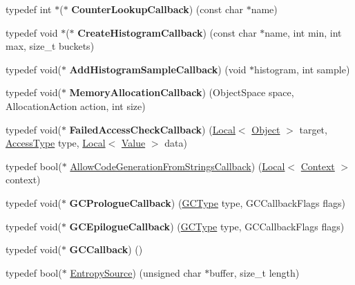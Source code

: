 \begin{DoxyCompactItemize}
\item 
\hypertarget{namespacev8_a5efca05a9f1f278a4eec832ce419104f}{}typedef int $\ast$($\ast$ {\bfseries Counter\+Lookup\+Callback}) (const char $\ast$name)\label{namespacev8_a5efca05a9f1f278a4eec832ce419104f}

\item 
\hypertarget{namespacev8_aafbf15734701792a14c02dbca7535b75}{}typedef void $\ast$($\ast$ {\bfseries Create\+Histogram\+Callback}) (const char $\ast$name, int min, int max, size\+\_\+t buckets)\label{namespacev8_aafbf15734701792a14c02dbca7535b75}

\item 
\hypertarget{namespacev8_a5a7c6bb8050ad84f0a453056ec325d1c}{}typedef void($\ast$ {\bfseries Add\+Histogram\+Sample\+Callback}) (void $\ast$histogram, int sample)\label{namespacev8_a5a7c6bb8050ad84f0a453056ec325d1c}

\item 
\hypertarget{namespacev8_a2402a6535cafc5f721192b300502fb0a}{}typedef void($\ast$ {\bfseries Memory\+Allocation\+Callback}) (Object\+Space space, Allocation\+Action action, int size)\label{namespacev8_a2402a6535cafc5f721192b300502fb0a}

\item 
\hypertarget{namespacev8_a1352a0d6e487b7092ea79e2d3d4ecd12}{}typedef void($\ast$ {\bfseries Failed\+Access\+Check\+Callback}) (\hyperlink{classv8_1_1_local}{Local}$<$ \hyperlink{classv8_1_1_object}{Object} $>$ target, \hyperlink{namespacev8_add8bef6469c5b94706584124e610046c}{Access\+Type} type, \hyperlink{classv8_1_1_local}{Local}$<$ \hyperlink{classv8_1_1_value}{Value} $>$ data)\label{namespacev8_a1352a0d6e487b7092ea79e2d3d4ecd12}

\item 
typedef bool($\ast$ \hyperlink{namespacev8_a521d909ec201742a1cb35d50a8e2a3c2}{Allow\+Code\+Generation\+From\+Strings\+Callback}) (\hyperlink{classv8_1_1_local}{Local}$<$ \hyperlink{classv8_1_1_context}{Context} $>$ context)
\item 
\hypertarget{namespacev8_a09e509ff7a94ad074420980c5f5762af}{}typedef void($\ast$ {\bfseries G\+C\+Prologue\+Callback}) (\hyperlink{namespacev8_ac109d6f27e0c0f9ef4e98bcf7a806cf2}{G\+C\+Type} type, G\+C\+Callback\+Flags flags)\label{namespacev8_a09e509ff7a94ad074420980c5f5762af}

\item 
\hypertarget{namespacev8_a4a818ae1aee0cb378a4c2037dfc4a4c2}{}typedef void($\ast$ {\bfseries G\+C\+Epilogue\+Callback}) (\hyperlink{namespacev8_ac109d6f27e0c0f9ef4e98bcf7a806cf2}{G\+C\+Type} type, G\+C\+Callback\+Flags flags)\label{namespacev8_a4a818ae1aee0cb378a4c2037dfc4a4c2}

\item 
\hypertarget{namespacev8_a226458957ce3c253b9a9f539bb5ddad4}{}typedef void($\ast$ {\bfseries G\+C\+Callback}) ()\label{namespacev8_a226458957ce3c253b9a9f539bb5ddad4}

\item 
typedef bool($\ast$ \hyperlink{namespacev8_ab699f4bbbb56350e6e915682e420fcdc}{Entropy\+Source}) (unsigned char $\ast$buffer, size\+\_\+t length)
\end{DoxyCompactItemize}
